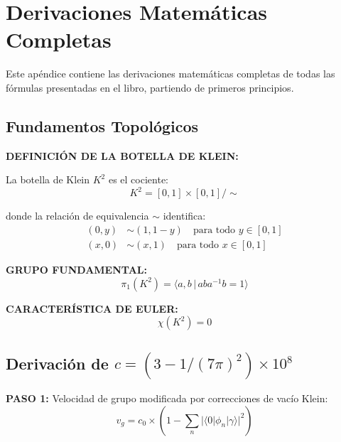\chapter{Derivaciones Matemáticas Completas}
\label{ap:derivaciones}

Este apéndice contiene las derivaciones matemáticas completas de todas las
fórmulas presentadas en el libro, partiendo de primeros principios.


\section{Fundamentos Topológicos}

\textbf{DEFINICIÓN DE LA BOTELLA DE KLEIN:}

La botella de Klein $K^2$ es el cociente:
\begin{equation}
K^2 = [0,1] \times [0,1] / \sim
\end{equation}

donde la relación de equivalencia $\sim$ identifica:
\begin{align}
(0, y) &\sim (1, 1-y) \quad \text{para todo } y \in [0,1]\\
(x, 0) &\sim (x, 1) \quad \text{para todo } x \in [0,1]
\end{align}

\textbf{GRUPO FUNDAMENTAL:}
\begin{equation}
\pi_1(K^2) = \langle a, b \,|\, aba^{-1}b = 1 \rangle
\end{equation}

\textbf{CARACTERÍSTICA DE EULER:}
\begin{equation}
\chi(K^2) = 0
\end{equation}


\section{Derivación de $c = (3 - 1/(7\pi)^2) \times 10^8$}

\textbf{PASO 1:} Velocidad de grupo modificada por correcciones de vacío Klein:
\begin{equation}
v_g = c_0 \times \left(1 - \sum_n |\langle 0|\phi_n|\gamma\rangle|^2\right)
\end{equation}

